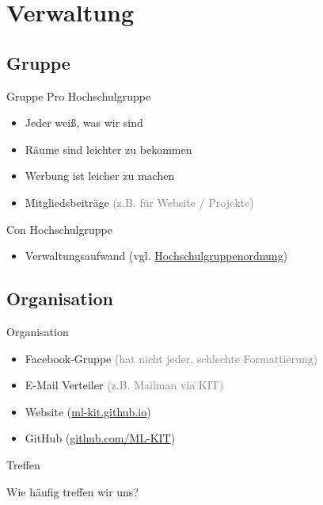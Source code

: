 \section{Verwaltung}
\subsection{Gruppe}

\begin{frame}{Gruppe}
    Pro Hochschulgruppe
    \begin{itemize}
        \item Jeder weiß, was wir sind
        \item Räume sind leichter zu bekommen
        \item Werbung ist leicher zu machen
        \item Mitgliedsbeiträge \textcolor{gray}{(z.B. für Website / Projekte)}
    \end{itemize}

    Con Hochschulgruppe
    \begin{itemize}
        \item Verwaltungsaufwand (vgl. \href{http://www.asta-kit.de/sites/www.usta.de/files/Hochschulgruppenordnung.pdf}{Hochschulgruppenordnung})
    \end{itemize}
\end{frame}

\subsection{Organisation}
\begin{frame}{Organisation}
    \begin{itemize}
        \item Facebook-Gruppe \textcolor{gray}{(hat nicht jeder, schlechte Formattierung)}
        \item E-Mail Verteiler \textcolor{gray}{(z.B. Mailman via KIT)}
        \item Website (\href{https://ml-kit.github.io}{ml-kit.github.io})
        \item GitHub (\href{https://github.com/ML-KIT}{github.com/ML-KIT})
    \end{itemize}
\end{frame}

\begin{frame}{Treffen}
    \begin{center}
        {\Huge Wie häufig treffen wir uns?}
    \end{center}
\end{frame}

